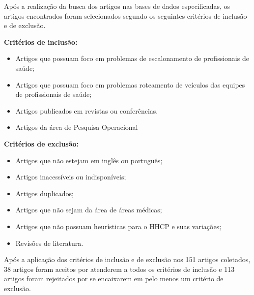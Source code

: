 
Após a realização da busca dos artigos nas bases de dados especificadas, os artigos encontrados foram selecionados segundo os seguintes critérios de inclusão e de exclusão.

\textbf{Critérios de inclusão:}
\begin{itemize}
\item Artigos que possuam foco em problemas de escalonamento de profissionais de saúde;
\item Artigos que possuam foco em problemas roteamento de veículos das equipes de profissionais de saúde;
\item Artigos publicados em revistas ou conferências.
\item Artigos da área de Pesquisa Operacional
\end{itemize}

\textbf{Critérios de exclusão:}
\begin{itemize}
\item Artigos que não estejam em inglês ou português;
\item Artigos inacessíveis ou indisponíveis;
\item Artigos duplicados;
\item Artigos que não sejam da área de áreas médicas;
\item Artigos que não possuam heurísticas para o \ac{HHCP} e suas variações;
\item Revisões de literatura.
\end{itemize}

Após a aplicação dos critérios de inclusão e de exclusão nos 151 artigos coletados, 38 artigos foram aceitos por atenderem a todos os critérios de inclusão e 113 artigos foram rejeitados por se encaixarem em pelo menos um critério de exclusão. %


